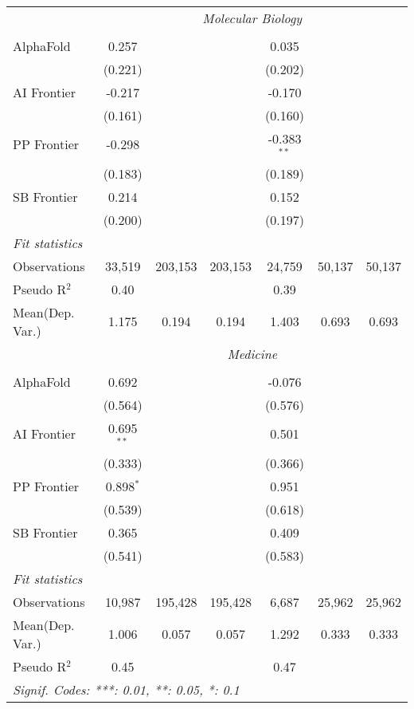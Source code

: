 \begin{tabular}{lcccccc}
 & \multicolumn{6}{c}{\textit{Molecular Biology}} \\ \\
   AlphaFold    & 0.257    &         &         & 0.035         &        &   \\   
                & (0.221)  &         &         & (0.202)       &        &   \\   
   AI Frontier  & -0.217   &         &         & -0.170        &        &   \\   
                & (0.161)  &         &         & (0.160)       &        &   \\   
   PP Frontier  & -0.298   &         &         & -0.383$^{**}$ &        &   \\   
                & (0.183)  &         &         & (0.189)       &        &   \\   
   SB Frontier  & 0.214    &         &         & 0.152         &        &   \\   
                & (0.200)  &         &         & (0.197)       &        &   \\   
   \midrule
   \emph{Fit statistics}\\
   Observations & 33,519   & 203,153 & 203,153 & 24,759        & 50,137 & 50,137\\  
   Pseudo R$^2$ & 0.40     &         &         & 0.39          &        & \\  
   
Mean(Dep. Var.) & 1.175 & 0.194 & 0.194 & 1.403 & 0.693 & 0.693 \\
 & \multicolumn{6}{c}{\textit{Medicine}} \\ \\
   AlphaFold    & 0.692        &         &         & -0.076  &        &   \\   
                & (0.564)      &         &         & (0.576) &        &   \\   
   AI Frontier  & 0.695$^{**}$ &         &         & 0.501   &        &   \\   
                & (0.333)      &         &         & (0.366) &        &   \\   
   PP Frontier  & 0.898$^{*}$  &         &         & 0.951   &        &   \\   
                & (0.539)      &         &         & (0.618) &        &   \\   
   SB Frontier  & 0.365        &         &         & 0.409   &        &   \\   
                & (0.541)      &         &         & (0.583) &        &   \\   
   \midrule
   \emph{Fit statistics}\\
   Observations & 10,987       & 195,428 & 195,428 & 6,687   & 25,962 & 25,962\\  
Mean(Dep. Var.) & 1.006 & 0.057 & 0.057 & 1.292 & 0.333 & 0.333 \\
   Pseudo R$^2$ & 0.45         &         &         & 0.47    &        & \\  
   \midrule \midrule
   \multicolumn{7}{l}{\emph{Signif. Codes: ***: 0.01, **: 0.05, *: 0.1}}\\
\end{tabular}
\par\endgroup
